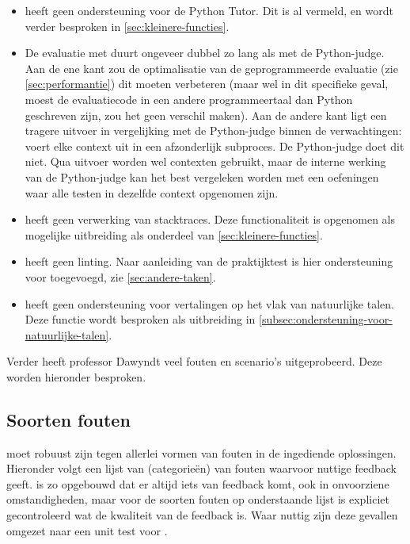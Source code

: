 \begin{itemize}
    \item \tested{} heeft geen ondersteuning voor de Python Tutor.
    Dit is al vermeld, en wordt verder besproken in \cref{sec:kleinere-functies}.
    \item De evaluatie met \tested{} duurt ongeveer dubbel zo lang als met de Python-judge.
    Aan de ene kant zou de optimalisatie van de geprogrammeerde evaluatie (zie \cref{sec:performantie}) dit moeten verbeteren (maar wel in dit specifieke geval, moest de evaluatiecode in een andere programmeertaal dan Python geschreven zijn, zou het geen verschil maken).
    Aan de andere kant ligt een tragere uitvoer in vergelijking met de Python-judge binnen de verwachtingen: \tested{} voert elke context uit in een afzonderlijk subproces.
    De Python-judge doet dit niet.
    Qua uitvoer worden wel contexten gebruikt, maar de interne werking van de Python-judge kan het best vergeleken worden met een oefeningen waar alle testen in dezelfde context opgenomen zijn.
    \item \tested{} heeft geen verwerking van stacktraces.
    Deze functionaliteit is opgenomen als mogelijke uitbreiding als onderdeel van \cref{sec:kleinere-functies}.
    \item \tested{} heeft geen linting.
    Naar aanleiding van de praktijktest is hier ondersteuning voor toegevoegd, zie \cref{sec:andere-taken}.
    \item \tested{} heeft geen ondersteuning voor vertalingen op het vlak van natuurlijke talen.
    Deze functie wordt besproken als uitbreiding in \cref{subsec:ondersteuning-voor-natuurlijke-talen}.
\end{itemize}

Verder heeft professor Dawyndt veel fouten en scenario's uitgeprobeerd.
Deze worden hieronder besproken.

\subsection{Soorten fouten}\label{subsec:soorten-fouten}

\tested{} moet robuust zijn tegen allerlei vormen van fouten in de ingediende oplossingen.
Hieronder volgt een lijst van (categorieën) van fouten waarvoor \tested{} nuttige feedback geeft.
\tested{} is zo opgebouwd dat er altijd iets van feedback komt, ook in onvoorziene omstandigheden, maar voor de soorten fouten op onderstaande lijst is expliciet gecontroleerd wat de kwaliteit van de feedback is.
Waar nuttig zijn deze gevallen omgezet naar een unit test voor \tested{}.

